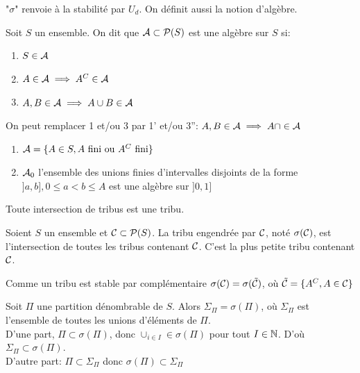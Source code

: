 \documentclass[]{report}
\begin{document}
    "$\sigma$" renvoie à la stabilité par $U_d$. On définit aussi la notion d'algèbre.

    \begin{df}{}{}
        Soit $S$ un ensemble. On dit que $\mathcal{A}\subset \mathcal{P}(S)$ est une algèbre sur $S$ si:
        \begin{enumerate}
            \item $S\in\mathcal{A}$
            \item $A\in\mathcal{A}\implies A^C\in\mathcal{A}$
            \item $A,B\in\mathcal{A}\implies A\cup B\in \mathcal{A}$
        \end{enumerate} 
    \end{df}

    \begin{re}{}{}
        On peut remplacer 1 et/ou 3 par 1' et/ou 3'': $A,B\in\mathcal{A}\implies A\cap\in\mathcal{A}$
    \end{re}

    \begin{ex}{}{}
        \begin{enumerate}
            \item $\mathcal{A}=\{A\in S, A\text{ fini ou $A^C$ fini}\}$
            \item $\mathcal{A}_0$ l'ensemble des unions finies d'intervalles disjoints de la forme $]a,b],0\le a<b\le A$ est une algèbre sur $]0,1]$
        \end{enumerate}
    \end{ex}

    \begin{prop}{}{}
        Toute intersection de tribus est une tribu.
    \end{prop}

    \begin{df}{}{}
        Soient $S$ un ensemble et $\mathcal{C}\subset \mathcal{P}(S)$. La tribu engendrée par $\mathcal{C}$, noté $\sigma(\mathcal{C})$, est l'intersection de toutes les tribus contenant $\mathcal{C}$. C'est la plus petite tribu contenant $\mathcal{C}$.
    \end{df}

    \begin{re}{}{}
        Comme un tribu est stable par complémentaire $\sigma(\mathcal{C})=\sigma(\tilde{\mathcal{C}})$, où $\tilde{\mathcal{C}}=\{A^C,A\in\mathcal{C}\}$
    \end{re}

    \begin{ex}{}{}
        Soit $\Pi$ une partition dénombrable de $S$. Alors $\Sigma_\Pi=\sigma(\Pi)$, où $\Sigma_\Pi$ est l'ensemble de toutes les unions d'éléments de $\Pi$.\\
        D'une part, $\Pi\subset\sigma(\Pi)$, donc $\cup_{i\in I}\in\sigma(\Pi)$ pour tout $I\in\mathbb{N}$. D'où $\Sigma_\Pi\subset\sigma(\Pi)$.\\
        D'autre part: $\Pi\subset \Sigma_\Pi$ donc $\sigma(\Pi)\subset\Sigma_\Pi$
    \end{ex}
\end{document}
